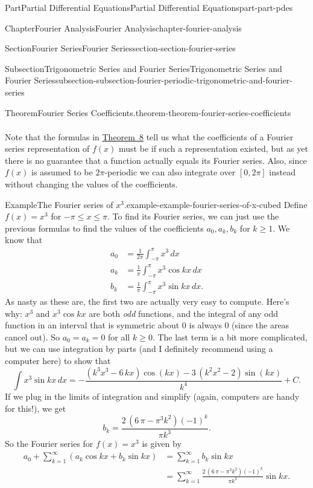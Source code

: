 \documentclass[twoside,10pt,]{book}
\numberwithin{equation}{part}
\newcommand{\amp}{&}
\begin{document}
\begin{partptx}{Part}{Partial Differential Equations}{}{Partial Differential Equations}{}{}{part-part-pdes}
\begin{chapterptx}{Chapter}{Fourier Analysis}{}{Fourier Analysis}{}{}{chapter-fourier-analysis}
\begin{sectionptx}{Section}{Fourier Series}{}{Fourier Series}{}{}{section-section-fourier-series}
\begin{subsectionptx}{Subsection}{Trigonometric Series and Fourier Series}{}{Trigonometric Series and Fourier Series}{}{}{subsection-subsection-fourier-periodic-trigonometric-and-fourier-series}
\begin{theorem}{Theorem}{Fourier Series Coefficients.}{}{theorem-theorem-fourier-series-coefficients}
\begin{align*}
\end{align*}
%
\end{theorem}
Note that the formulas in \hyperref[theorem-theorem-fourier-series-coefficients]{Theorem~8} tell us what the coefficients of a Fourier series representation of \(f(x)\) must be if such a representation existed, but as yet there is no guarantee that a function actually equals its Fourier series. Also, since \(f(x)\) is assumed to be \(2\pi\)-periodic we can also integrate over \([0,2\pi]\) instead without changing the values of the coefficients.%
\begin{example}{Example}{The Fourier series of \(x^{3}\).}{example-example-fourier-series-of-x-cubed}%
Define \(f(x) = x^{3}\) for \(-\pi\leq x\leq \pi\). To find its Fourier series, we can just use the previous formulas to find the values of the coefficients \(a_{0},a_{k},b_{k}\) for \(k\geq1\). We know that%
\begin{align*}
a_{0} \amp = \frac{1}{2\pi}\int_{-\pi}^{\pi}x^{3}\,dx\\
a_{k} \amp = \frac{1}{\pi}\int_{-\pi}^{\pi}x^{3}\cos kx\,dx \\
b_{k} \amp = \frac{1}{\pi}\int_{-\pi}^{\pi}x^{3}\sin kx\,dx.
\end{align*}
As nasty as these are, the first two are actually very easy to compute. Here's why: \(x^{3}\) and \(x^{3}\cos kx\) are both \emph{odd} functions, and the integral of any odd function in an interval that is symmetric about \(0\) is always \(0\) (since the areas cancel out). So \(a_{0} = a_{k} = 0\) for all \(k\geq0\). The last term is a bit more complicated, but we can use integration by parts (and I definitely recommend using a computer here) to show that%
\begin{equation*}
\int x^{3}\sin kx\,dx = -\frac{{\left(k^{3} x^{3} - 6 \, k x\right)} \cos\left(k x\right) - 3 \, {\left(k^{2} x^{2} - 2\right)} \sin\left(k x\right)}{k^{4}} + C.
\end{equation*}
If we plug in the limits of integration and simplify (again, computers are handy for this!), we get%
\begin{equation*}
b_{k} = \frac{2 \, {\left(6 \, \pi - \pi^{3} k^{2}\right)} \left(-1\right)^{k}}{\pi k^{3}}.
\end{equation*}
So the Fourier series for \(f(x) = x^{3}\) is given by%
\begin{align*}
a_{0} + \sum_{k=1}^{\infty}(a_{k}\cos kx+b_{k}\sin kx) \amp= \sum_{k=1}^{\infty}b_{k}\sin kx \\
\amp= \sum_{k=1}^{\infty}\frac{2 \, {\left(6 \, \pi - \pi^{3} k^{2}\right)} \left(-1\right)^{k}}{\pi k^{3}}\sin kx. 

\end{align*}
\end{example}
\end{subsectionptx}
\end{sectionptx}
\end{chapterptx}
\end{partptx}
\end{document}
